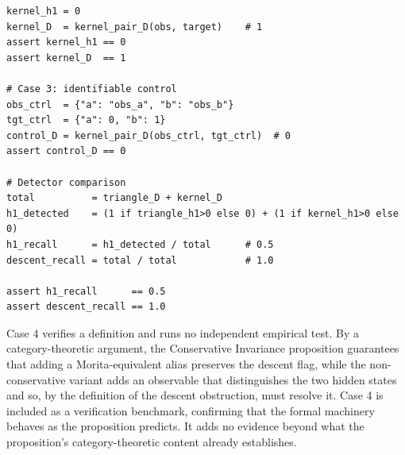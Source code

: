 \documentclass[11pt]{article}
\begin{document}
\begin{lstlisting}
kernel_h1 = 0
kernel_D  = kernel_pair_D(obs, target)    # 1
assert kernel_h1 == 0
assert kernel_D  == 1

# Case 3: identifiable control
obs_ctrl  = {"a": "obs_a", "b": "obs_b"}
tgt_ctrl  = {"a": 0, "b": 1}
control_D = kernel_pair_D(obs_ctrl, tgt_ctrl)  # 0
assert control_D == 0

# Detector comparison
total          = triangle_D + kernel_D
h1_detected    = (1 if triangle_h1>0 else 0) + (1 if kernel_h1>0 else 0)
h1_recall      = h1_detected / total      # 0.5
descent_recall = total / total            # 1.0

assert h1_recall      == 0.5
assert descent_recall == 1.0
\end{lstlisting}

Case 4 verifies a definition and runs no independent
empirical test. By a category-theoretic argument, the Conservative
Invariance proposition guarantees that adding a Morita-equivalent alias preserves
the descent flag, while the non-conservative variant adds an observable that
distinguishes the two hidden states and so, by the definition of the descent
obstruction, must resolve it. Case 4 is included as a verification benchmark,
confirming that the formal machinery behaves as the proposition predicts. It adds no
evidence beyond what the proposition's category-theoretic content already
establishes.
\end{document}
